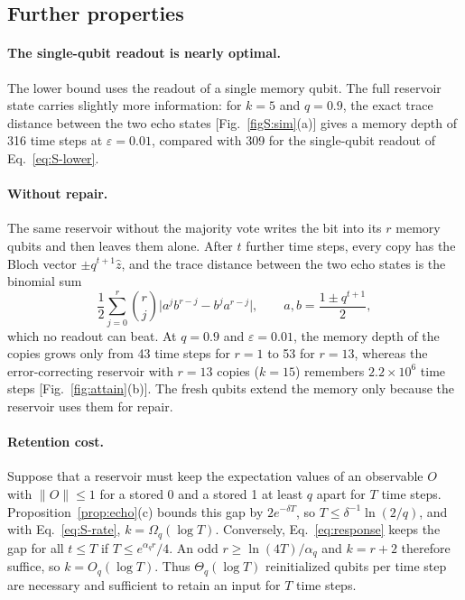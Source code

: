 \documentclass[aps,prl,twocolumn,superscriptaddress,floatfix]{revtex4-2}
\theoremstyle{plain}
\newcommand{\Norm}[1]{\lVert #1\rVert}
\begin{document}
\subsection{Further properties}

\paragraph*{The single-qubit readout is nearly optimal.} The lower bound uses the readout of a single memory qubit. The full reservoir state carries slightly more information: for $k=5$ and $q=0.9$, the exact trace distance between the two echo states [Fig.~\ref{figS:sim}(a)] gives a memory depth of 316 time steps at $\varepsilon=0.01$, compared with 309 for the single-qubit readout of Eq.~\eqref{eq:S-lower}.

\paragraph*{Without repair.} The same reservoir without the majority vote writes the bit into its $r$ memory qubits and then leaves them alone. After $t$ further time steps, every copy has the Bloch vector $\pm q^{t+1}\hat z$, and the trace distance between the two echo states is the binomial sum
\[
\frac12\sum_{j=0}^{r}\binom rj\bigl|a^jb^{r-j}-b^ja^{r-j}\bigr|,\qquad a,b=\frac{1\pm q^{t+1}}2,
\]
which no readout can beat. At $q=0.9$ and $\varepsilon=0.01$, the memory depth of the copies grows only from 43 time steps for $r=1$ to 53 for $r=13$, whereas the error-correcting reservoir with $r=13$ copies ($k=15$) remembers $2.2\times10^6$ time steps [Fig.~\ref{fig:attain}(b)]. The fresh qubits extend the memory only because the reservoir uses them for repair.

\paragraph*{Retention cost.} Suppose that a reservoir must keep the expectation values of an observable $O$ with $\Norm O\le1$ for a stored 0 and a stored 1 at least $q$ apart for $T$ time steps. Proposition~\ref{prop:echo}(c) bounds this gap by $2e^{-\delta T}$, so $T\le\delta^{-1}\ln(2/q)$, and with Eq.~\eqref{eq:S-rate}, $k=\Omega_q(\log T)$. Conversely, Eq.~\eqref{eq:response} keeps the gap for all $t\le T$ if $T\le e^{\alpha_qr}/4$. An odd $r\ge\ln(4T)/\alpha_q$ and $k=r+2$ therefore suffice, so $k=O_q(\log T)$. Thus $\Theta_q(\log T)$ reinitialized qubits per time step are necessary and sufficient to retain an input for $T$ time steps.
\end{document}
